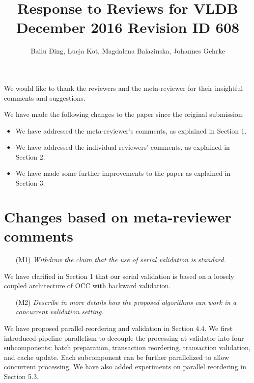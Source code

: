\documentclass{article}
\begin{document}
\title{Response to Reviews for VLDB December 2016 Revision ID 608}
\author{Bailu Ding, Lucja Kot, Magdalena Balazinska, Johannes Gehrke}
\maketitle

We would like to thank the reviewers and the meta-reviewer for their insightful comments and suggestions. 

We have made the following changes to the paper since the original submission:
\begin{itemize}
\item We have addressed the meta-reviewer's comments, as explained in Section 1.
\vspace{-.5em}
\item We have addressed the individual reviewers' comments, as explained in Section 2.
\vspace{-.5em}
\item We have made some further improvements to the paper as explained in Section 3.
\vspace{-.5em}
\end{itemize}

\section{Changes based on meta-reviewer comments}

\begin{itemize}
\item[(M1)] \emph{Withdraw the claim that the use of serial validation is standard. }
\end{itemize}
We have clarified in Section 1 that our serial validation is based on a loosely coupled architecture of OCC with backward validation.

\begin{itemize}
\item[(M2)] \emph{Describe in more details how the proposed algorithms can work in a concurrent validation setting. }
\end{itemize}
We have proposed parallel reordering and validation in Section 4.4. We first introduced pipeline parallelism to decouple the processing at validator into four subcomponents: batch preparation, transaction reordering, transaction validation, and cache update. Each subcomponent can be further parallelized to allow concurrent processing. We have also added experiments on parallel reordering in Section 5.3. 
\end{document}
